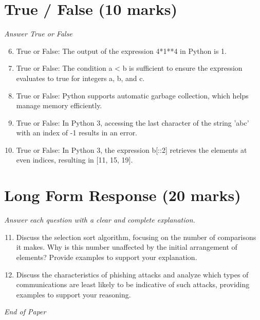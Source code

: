 \documentclass[12pt]{article}
\begin{document}
\section*{True / False (10 marks)}
\textit{Answer True or False}
\begin{enumerate}[label=\arabic*.]
\setcounter{enumi}{5}
\item True or False: The output of the expression 4*1**4 in Python is 1.
\item True or False: The condition a \textless{} b is sufficient to ensure the expression evaluates to true for integers a, b, and c.
\item True or False: Python supports automatic garbage collection, which helps manage memory efficiently.
\item True or False: In Python 3, accessing the last character of the string 'abc' with an index of -1 results in an error.
\item True or False: In Python 3, the expression b[::2] retrieves the elements at even indices, resulting in [11, 15, 19].
\end{enumerate}

\section*{Long Form Response (20 marks)}
\textit{Answer each question with a clear and complete explanation.}
\begin{enumerate}[label=\arabic*.]
\setcounter{enumi}{10}
\item Discuss the selection sort algorithm, focusing on the number of comparisons it makes. Why is this number unaffected by the initial arrangement of elements? Provide examples to support your explanation.
\item Discuss the characteristics of phishing attacks and analyze which types of communications are least likely to be indicative of such attacks, providing examples to support your reasoning.
\end{enumerate}

\vfill
\noindent\textit{End of Paper}
\end{document}

